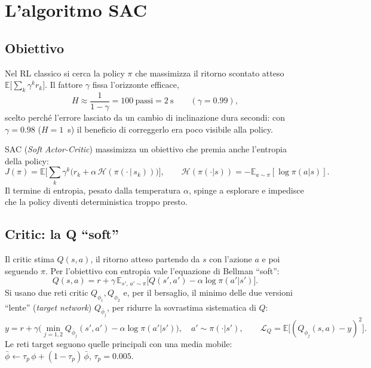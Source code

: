\documentclass[11pt,a4paper]{article}
\begin{document}
\section{L'algoritmo SAC}

\subsection{Obiettivo}
Nel RL classico si cerca la policy $\pi$ che massimizza il ritorno scontato atteso
$\mathbb{E}\big[\sum_k \gamma^k r_k\big]$. Il fattore $\gamma$ fissa l'orizzonte efficace,
\begin{equation}
H \approx \frac{1}{1-\gamma} = 100\ \text{passi} = 2\ \text{s}\qquad(\gamma = 0.99),
\end{equation}
scelto perché l'errore lasciato da un cambio di inclinazione dura secondi: con $\gamma = 0.98$
($H = 1$~s) il beneficio di correggerlo era poco visibile alla policy.

SAC (\emph{Soft Actor-Critic}) massimizza un obiettivo che premia anche l'entropia della policy:
\begin{equation}
J(\pi) = \mathbb{E}\Big[\sum_k \gamma^k\big(r_k + \alpha\,\mathcal{H}(\pi(\cdot\,|\,s_k))\big)\Big],
\qquad \mathcal{H}(\pi(\cdot|s)) = -\mathbb{E}_{a\sim\pi}[\log\pi(a|s)] .
\end{equation}
Il termine di entropia, pesato dalla temperatura $\alpha$, spinge a esplorare e impedisce che la
policy diventi deterministica troppo presto.

\subsection{Critic: la Q ``soft''}
Il critic stima $Q(s,a)$, il ritorno atteso partendo da $s$ con l'azione $a$ e poi seguendo $\pi$.
Per l'obiettivo con entropia vale l'equazione di Bellman ``soft'':
\begin{equation}
Q(s,a) = r + \gamma\,\mathbb{E}_{s',\,a'\sim\pi}\big[Q(s',a') - \alpha\log\pi(a'|s')\big].
\end{equation}
Si usano due reti critic $Q_{\phi_1}, Q_{\phi_2}$ e, per il bersaglio, il minimo delle due versioni
``lente'' (\emph{target network}) $Q_{\bar\phi_j}$, per ridurre la sovrastima sistematica di $Q$:
\begin{equation}
y = r + \gamma\Big(\min_{j=1,2} Q_{\bar\phi_j}(s',a') - \alpha\log\pi(a'|s')\Big),\quad a'\sim\pi(\cdot|s'),
\qquad \mathcal{L}_Q = \mathbb{E}\big[(Q_{\phi_j}(s,a) - y)^2\big].
\end{equation}
Le reti target seguono quelle principali con una media mobile:
$\bar\phi \leftarrow \tau_p\,\phi + (1-\tau_p)\,\bar\phi$, $\tau_p = 0.005$.
\end{document}

